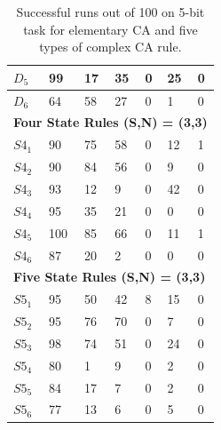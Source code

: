 \documentclass{elsarticle}
\begin{document}
\begin{multicols}{2}
\begin{table}[!htb]
\begin{tabular}{|l|l|l|l|l|l|l|}
$D_{5}$ & 99 & 17 & 35 & 0 & 25 & 0 \\ \hline
$D_{6}$ & 64 & 58 & 27 & 0 & 1 & 0 \\ \hline
\multicolumn{7}{|l|}{\textbf{Four State Rules (S,N) = (3,3)}} \\ \hline
$S4_{1}$ & 90 & 75 & 58 & 0 & 12  & 1 \\ \hline
$S4_{2}$ & 90 & 84 & 56 & 0 & 9 & 0  \\ \hline
$S4_{3}$ & 93 & 12 & 9 & 0 & 42 & 0 \\ \hline
$S4_{4}$ & 95 & 35 & 21 & 0 & 0 & 0 \\ \hline
$S4_{5}$ & 100 & 85 & 66 & 0 & 11 & 1 \\ \hline
$S4_{6}$ & 87 & 20 & 2 & 0 & 0 & 0 \\ \hline
\multicolumn{7}{|l|}{\textbf{Five State Rules (S,N) = (3,3)}} \\ \hline
$S5_{1}$ & 95 & 50 & 42 & 8 & 15 & 0 \\ \hline
$S5_{2}$ & 95 & 76 & 70 & 0 & 7 & 0 \\ \hline
$S5_{3}$ & 98 & 74 & 51 & 0 & 24 & 0 \\ \hline
$S5_{4}$ & 80 & 1 & 9 & 0 & 2 & 0 \\ \hline
$S5_{5}$ & 84 & 17 & 7 & 0 & 2 & 0 \\ \hline
$S5_{6}$ & 77 & 13 & 6 & 0 & 5 & 0 \\ \hline
\end{tabular}
\caption{Successful runs out of 100 on 5-bit task for elementary CA and five 
    types of complex CA rule.}
\label{table:results}
\end{table}



\end{multicols}
\end{document}
